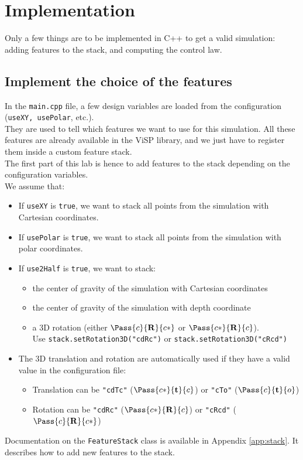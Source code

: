\documentclass{ecnreport}
\begin{document}
\section{Implementation}

Only a few things are to be implemented in C++ to get a valid simulation: adding features to the stack, and computing the control law.

\subsection{Implement the choice of the features}

In the \texttt{main.cpp} file, a few design variables are loaded from the configuration (\texttt{useXY, usePolar}, etc.).\\

They are used to tell which features we want to use for this simulation. All these features are already available in the ViSP library, and we just have to register them inside a custom feature stack.\\

The first part of this lab is hence to add features to the stack depending on the configuration variables.\\
We assume that:
\begin{itemize}
 \item If \texttt{useXY} is \texttt{true}, we want to stack all points from the simulation with Cartesian coordinates.
 \item If \texttt{usePolar} is \texttt{true}, we want to stack all points from the simulation with polar coordinates.
 \item If \texttt{use2Half} is \texttt{true}, we want to stack:
 \begin{itemize}
  \item the center of gravity of the simulation with Cartesian coordinates
  \item the center of gravity of the simulation with depth coordinate
  \item a 3D rotation (either $\Pass{c}{\mathbf{R}}{c*}$ or $\Pass{c*}{\mathbf{R}}{c}$).\\Use \texttt{stack.setRotation3D("cdRc")} or \texttt{stack.setRotation3D("cRcd")}
 \end{itemize}
 \item The 3D translation and rotation are automatically used if they have a valid value in the configuration file:
 \begin{itemize}
  \item Translation can be \texttt{"cdTc"} ($\Pass{c*}{\mathbf{t}}{c}$) or \texttt{"cTo"} ($\Pass{c}{\mathbf{t}}{o}$)
  \item Rotation can be  \texttt{"cdRc"} ($\Pass{c*}{\mathbf{R}}{c}$) or \texttt{"cRcd"} ($\Pass{c}{\mathbf{R}}{c*}$)
 \end{itemize}
\end{itemize}
Documentation on the \texttt{FeatureStack} class is available in Appendix \ref{app:stack}. It describes how to add new features to the stack.\\
\end{document}
